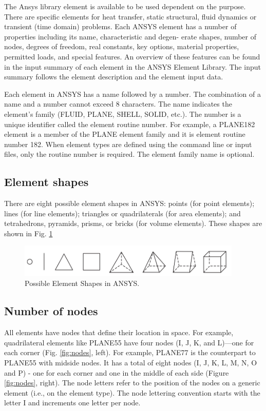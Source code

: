 \documentclass[letterpaper,pdftex]{article}
\begin{document}
The Ansys library element is available to be used dependent on the purpose. There are specific elements for heat transfer, static structural, fluid dynamics or transient (time domain) problems. Each ANSYS element has a number of properties including its name, characteristic and degen- erate shapes, number of nodes, degrees of freedom, real constants, key options, material properties, permitted loads, and special features. An overview of these features can be found in the input summary of each element in the ANSYS Element Library. The input summary follows the element description and the element input data.

Each element in ANSYS has a name followed by a number. The combination of a name and a number cannot exceed 8 characters. The name indicates the element’s family (FLUID, PLANE, SHELL, SOLID, etc.). The number is a unique identifier called the element routine number. For example, a PLANE182 element is a member of the PLANE element family and it is element routine number 182. When element types are defined using the command line or input files, only the routine number is required. The element family name is optional.

\subsection{Element shapes}

There are eight possible element shapes in ANSYS: points (for point elements); lines (for line elements); triangles or quadrilaterals (for area elements); and tetrahedrons, pyramids, prisms, or bricks (for volume elements). These shapes are shown in Fig. \ref{fig:shapes}

\begin{figure}[h]
   \centering
   \includegraphics[width=0.95\textwidth]{elementshapes}
   \caption{Possible Element Shapes in ANSYS.}
   \label{fig:shapes}
\end{figure}

\subsection{Number of nodes}

All elements have nodes that define their location in space. For example, quadrilateral elements like PLANE55 have four nodes (I, J, K, and L)—one for each corner (Fig. \ref{fig:nodes}, left). For example, PLANE77 is the counterpart to PLANE55 with midside nodes. It has a total of eight nodes (I, J, K, L, M, N, O and P) - one for each corner and one in the middle of each side (Figure \ref{fig:nodes}, right). The node letters refer to the position of the nodes on a generic element (i.e., on the element type). The node lettering convention starts with the letter I and increments one letter per node.
\end{document}

